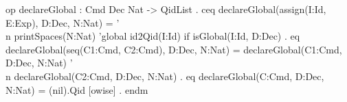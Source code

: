 \documentclass{llncs}%
\begin{document}
    op declareGlobal : Cmd Dec Nat -> QidList .
   ceq declareGlobal(assign(I:Id, E:Exp), D:Dec, N:Nat) = 
       '\\n printSpaces(N:Nat) 'global id2Qid(I:Id) 
    if isGlobal(I:Id, D:Dec) .    
    eq declareGlobal(seq(C1:Cmd, C2:Cmd), D:Dec, N:Nat) =
       declareGlobal(C1:Cmd, D:Dec, N:Nat) '\\n
       declareGlobal(C2:Cmd, D:Dec, N:Nat) .
    eq declareGlobal(C:Cmd, D:Dec, N:Nat) = (nil).Qid [owise] .
endm
\nwendcode{}\nwdocspar



\end{document}

